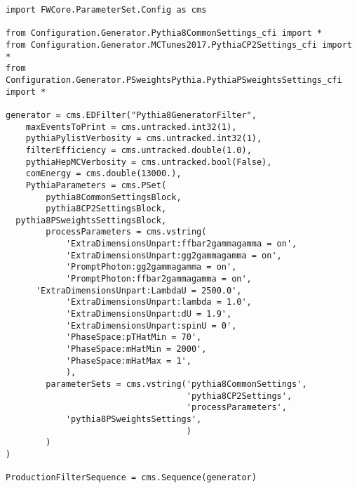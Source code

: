 \begin{verbatim}
import FWCore.ParameterSet.Config as cms 

from Configuration.Generator.Pythia8CommonSettings_cfi import *
from Configuration.Generator.MCTunes2017.PythiaCP2Settings_cfi import *
from Configuration.Generator.PSweightsPythia.PythiaPSweightsSettings_cfi import *

generator = cms.EDFilter("Pythia8GeneratorFilter",
    maxEventsToPrint = cms.untracked.int32(1),
    pythiaPylistVerbosity = cms.untracked.int32(1),
    filterEfficiency = cms.untracked.double(1.0),
    pythiaHepMCVerbosity = cms.untracked.bool(False),
    comEnergy = cms.double(13000.),
    PythiaParameters = cms.PSet(
        pythia8CommonSettingsBlock,
        pythia8CP2SettingsBlock,
  pythia8PSweightsSettingsBlock,
        processParameters = cms.vstring(
            'ExtraDimensionsUnpart:ffbar2gammagamma = on',
            'ExtraDimensionsUnpart:gg2gammagamma = on',
            'PromptPhoton:gg2gammagamma = on',
            'PromptPhoton:ffbar2gammagamma = on',
      'ExtraDimensionsUnpart:LambdaU = 2500.0',
            'ExtraDimensionsUnpart:lambda = 1.0',
            'ExtraDimensionsUnpart:dU = 1.9',
            'ExtraDimensionsUnpart:spinU = 0',
            'PhaseSpace:pTHatMin = 70',
            'PhaseSpace:mHatMin = 2000',
            'PhaseSpace:mHatMax = 1',
            ),  
        parameterSets = cms.vstring('pythia8CommonSettings',
                                    'pythia8CP2Settings',
                                    'processParameters',
            'pythia8PSweightsSettings',
                                    )   
        )   
)

ProductionFilterSequence = cms.Sequence(generator)

\end{verbatim}